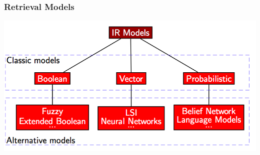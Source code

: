 \documentclass[svgnames]{beamer}
\begin{document}





\begin{frame}
  \frametitle{Retrieval Models}

  \begin{center}
    \includegraphics[width=.8\linewidth]{retrieval-models.png}\\
  \end{center}

\end{frame}
\end{document}
